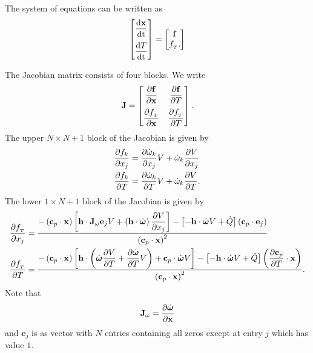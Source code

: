\documentclass[fontsize=12pt, %
               paper=a4, %
               hyperref]{report}
\begin{document}
The system of equations can be written as 
\begin{align}
  \begin{bmatrix}
    \displaystyle \frac{\mathrm{d} \mathbf{x}}{\mathrm{d} \mathrm{t}} \\[1.0em] \displaystyle \frac{\mathrm{d} T}{\mathrm{d} \mathrm{t}} 
  \end{bmatrix}
  = 
  \begin{bmatrix}
    \mathbf{f} \\ f_{_{T}}.
  \end{bmatrix}
\end{align}

The Jacobian matrix consists of four blocks.  We write 
\begin{align}
  \mathbf{J} = 
  \begin{bmatrix}
    \displaystyle \frac{\partial \mathbf{f}}{\partial \mathbf{x}} & \displaystyle \frac{\partial \mathbf{f}}{\partial T} \\[1.0em]
    \displaystyle \frac{\partial f_{_{T}}}{\partial \mathbf{x}} & \displaystyle \frac{\partial f_{_{T}}}{\partial T}
  \end{bmatrix}.
\end{align}
The upper $N \times N + 1$ block of the Jacobian is given by  
\begin{align}
  \frac{\partial f_{k}}{\partial x_{j}} &= \frac{\partial \dot{\omega}_{k}}{\partial x_{j}}V + \dot{\omega}_{k}\frac{\partial V}{\partial x_{j}} \\
  \frac{\partial f_{k}}{\partial T} &= \frac{\partial \dot{\omega}_{k}}{\partial T}V + \dot{\omega}_{k}\frac{\partial V}{\partial T}.
\end{align}
The lower $1 \times N + 1$ block of the Jacobian is given by 
\begin{align}
  \frac{\partial f_{_{T}}}{\partial x_{j}} &= 
    \frac{\displaystyle -\left(\mathbf{c}_{p}\cdot\mathbf{x}\right)\left[\mathbf{h}\cdot\mathbf{J}_{\omega}\mathbf{e}_{j}V + 
           \left(\mathbf{h}\cdot\dot{\boldsymbol{\omega}}\right)\frac{\partial V}{\partial x_{j}}\right] - \left[-\mathbf{h}\cdot\dot{\boldsymbol{\omega}} V + 
           \dot{Q}\right]\left(\mathbf{c}_{p}\cdot\mathbf{e}_{j}\right)}{\displaystyle \left(\mathbf{c}_{p}\cdot\mathbf{x}\right)^{2}} \\
  \frac{\partial f_{_{T}}}{\partial T} &= 
  \frac{\displaystyle -\left(\mathbf{c}_{p}\cdot\mathbf{x}\right)\left[\mathbf{h}\cdot\left(\dot{\boldsymbol{\omega}}\frac{\partial V}{\partial T} + 
             \frac{\partial \dot{\boldsymbol{\omega}}}{\partial T}V\right) + \mathbf{c}_{p}\cdot\dot{\boldsymbol{\omega}} V\right] - 
        \left[-\mathbf{h}\cdot\dot{\boldsymbol{\omega}} V + \dot{Q}\right]\left(\frac{\partial \mathbf{c}_{p}}{\partial T}\cdot\mathbf{x}\right)}
       {\displaystyle \left(\mathbf{c}_{p}\cdot\mathbf{x}\right)^{2}}.
\end{align}
Note that 
\begin{align}
  \mathbf{J}_{\omega} = \frac{\partial \dot{\boldsymbol{\omega}}}{\partial \mathbf{x}}
\end{align}
and $\mathbf{e}_{j}$ is as vector with $N$ entries containing all 
zeros except at entry $j$ which has value $1$.
\end{document}
